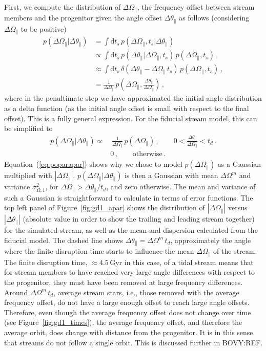 \documentclass[12pt,preprint]{aastex}
\newcommand{\ie}{i.e.}
\newcommand{\dd}{\mathrm{d}}
\newcommand{\Eqnname}{Equation}
\renewcommand{\figurename}{Figure}
\newcommand{\Gyr}{\ensuremath{\,\mathrm{Gyr}}}
\newcommand{\apar}{\ensuremath{\theta_\parallel}}
\newcommand{\opar}{\ensuremath{\Omega_\parallel}}
\newcommand{\ts}{\ensuremath{t_s}}
\begin{document}
First, we compute the distribution of $\Delta \opar$, the frequency
offset between stream members and the progenitor given the angle
offset $\Delta \apar$ as follows (considering $\Delta \opar$ to be
positive)
\begin{equation}\label{eq:poparapargeneral}
\begin{split}
  p(\Delta \opar|\Delta \apar) & = \int \dd \ts\,p(\Delta \opar,\ts|\Delta \apar)\, \\
  & \propto \int \dd \ts \,p(\Delta \apar | \Delta \opar,\ts)\,p(\Delta \opar,\ts)\,,\\
  & \approx \int \dd \ts \,\delta(\Delta \apar - \Delta \opar\,\ts)\,p(\Delta \opar,\ts)\,,\\
  & = \frac{1}{\Delta \opar}\,p(\Delta \opar,\frac{\Delta \apar}{\Delta \opar})\,,
\end{split}
\end{equation}
where in the penultimate step we have approximated the initial angle
distribution as a delta function (as the initial angle offset is small
with respect to the final offset). This is a fully general
expression. For the fiducial stream model, this can be simplified to
\begin{equation}\label{eq:poparapar}
\begin{split}
  p(\Delta \opar|\Delta \apar) \propto &\ \frac{1}{\Delta \opar}\,p(\Delta \opar)\,,\qquad 0 < \frac{\Delta \apar}{\Delta \opar} < t_d\,.\\
  & 0\,,\qquad \mathrm{otherwise}\,.
\end{split}
\end{equation}
\Eqnname~(\ref{eq:poparapar}) shows why we chose to model
$p(\Delta \opar)$ as a Gaussian multiplied with $|\Delta
\opar|$. $p(\Delta \opar|\Delta \apar)$ is then a Gaussian with mean
$\Delta \Omega^m$ and variance $\sigma^2_{\Omega,1}$, for $\Delta
\opar > \Delta \apar / t_d$, and zero otherwise. The mean and variance
of such a Gaussian is straightforward to calculate in terms of error
functions. The top left panel of \figurename~\ref{fig:gd1_apar} shows
the distribution of $|\Delta \opar|$ versus $|\Delta \apar|$ (absolute
value in order to show the trailing and leading stream together) for
the simulated stream, as well as the mean and dispersion calculated
from the fiducial model. The dashed line shows $\Delta \apar = \Delta
\Omega^m \,t_d$, approximately the angle where the finite disruption
time starts to influence the mean $\Delta \opar$ of the stream. The
finite disruption time, $\approx 4.5\Gyr$ in this case, of a tidal
stream means that for stream members to have reached very large angle
differences with respect to the progenitor, they must have been
removed at large frequency differences. Around $\Delta \Omega^m
\,t_d$, average stream stars, \ie, those removed with the average
frequency offset, do not have a large enough offset to reach large
angle offsets. Therefore, even though the average frequency offset
does not change over time (see \figurename~\ref{fig:gd1_times}), the
average frequency offset, and therefore the average orbit, does change
with distance from the progenitor. It is in this sense that streams do
not follow a single orbit. This is discussed further in BOVY:REF.
\end{document}
